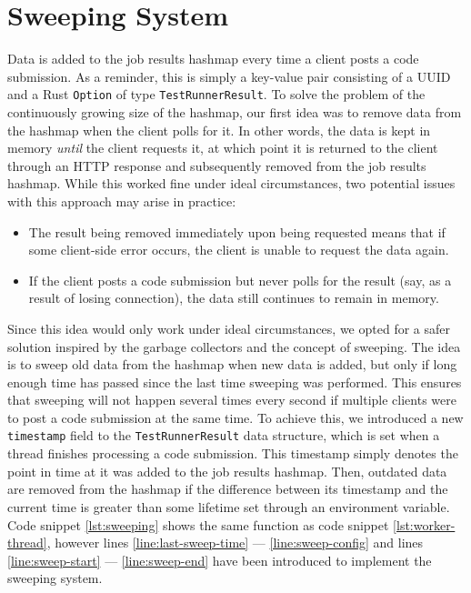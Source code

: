 \section{Sweeping System}
Data is added to the job results hashmap every time a client posts a code submission.
As a reminder, this is simply a key-value pair consisting of a UUID and a Rust \texttt{Option} of type \texttt{TestRunnerResult}.
To solve the problem of the continuously growing size of the hashmap, our first idea was to remove data from the hashmap when the client polls for it.
In other words, the data is kept in memory \textit{until} the client requests it, at which point it is returned to the client through an HTTP response and subsequently removed from the job results hashmap.
While this worked fine under ideal circumstances, two potential issues with this approach may arise in practice:
\begin{itemize}
    \item The result being removed immediately upon being requested means that if some client-side error occurs, the client is unable to request the data again.
    \item If the client posts a code submission but never polls for the result (say, as a result of losing connection), the data still continues to remain in memory.
\end{itemize}

Since this idea would only work under ideal circumstances, we opted for a safer solution inspired by the garbage collectors and the concept of sweeping.
The idea is to sweep old data from the hashmap when new data is added, but only if long enough time has passed since the last time sweeping was performed.
This ensures that sweeping will not happen several times every second if multiple clients were to post a code submission at the same time.
To achieve this, we introduced a new \texttt{timestamp} field to the \texttt{TestRunnerResult} data structure, which is set when a thread finishes processing a code submission.
This timestamp simply denotes the point in time at it was added to the job results hashmap.
Then, outdated data are removed from the hashmap if the difference between its timestamp and the current time is greater than some lifetime set through an environment variable.
Code snippet \ref{lst:sweeping} shows the same function as code snippet \ref{lst:worker-thread}, however lines \ref{line:last-sweep-time} --- \ref{line:sweep-config} and lines \ref{line:sweep-start} --- \ref{line:sweep-end} have been introduced to implement the sweeping system.

